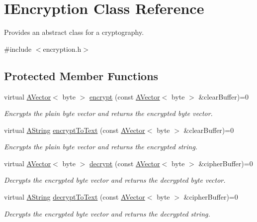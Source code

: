 \hypertarget{class_i_encryption}{}\section{I\+Encryption Class Reference}
\label{class_i_encryption}


Provides an abstract class for a cryptography.  




{\ttfamily \#include $<$encryption.\+h$>$}

\subsection*{Protected Member Functions}
\begin{DoxyCompactItemize}
\item 
virtual \mbox{\hyperlink{class_a_vector}{A\+Vector}}$<$ byte $>$ \mbox{\hyperlink{class_i_encryption_aa888b4e42172490054708fb099626458}{encrypt}} (const \mbox{\hyperlink{class_a_vector}{A\+Vector}}$<$ byte $>$ \&clear\+Buffer)=0
\begin{DoxyCompactList}\small\item\em Encrypts the plain byte vector and returns the encrypted byte vector. \end{DoxyCompactList}\item 
virtual \mbox{\hyperlink{class_a_string}{A\+String}} \mbox{\hyperlink{class_i_encryption_aef8211993831f83e031e7f1e9f978a4d}{encrypt\+To\+Text}} (const \mbox{\hyperlink{class_a_vector}{A\+Vector}}$<$ byte $>$ \&clear\+Buffer)=0
\begin{DoxyCompactList}\small\item\em Encrypts the plain byte vector and returns the encrypted string. \end{DoxyCompactList}\item 
virtual \mbox{\hyperlink{class_a_vector}{A\+Vector}}$<$ byte $>$ \mbox{\hyperlink{class_i_encryption_a07250dc1d1f1cd6de54df34e079f749d}{decrypt}} (const \mbox{\hyperlink{class_a_vector}{A\+Vector}}$<$ byte $>$ \&cipher\+Buffer)=0
\begin{DoxyCompactList}\small\item\em Decrypts the encrypted byte vector and returns the decrypted byte vector. \end{DoxyCompactList}\item 
virtual \mbox{\hyperlink{class_a_string}{A\+String}} \mbox{\hyperlink{class_i_encryption_ad1dafdacb077abfd40a995ae22ef0396}{decrypt\+To\+Text}} (const \mbox{\hyperlink{class_a_vector}{A\+Vector}}$<$ byte $>$ \&cipher\+Buffer)=0
\begin{DoxyCompactList}\small\item\em Decrypts the encrypted byte vector and returns the decrypted string. \end{DoxyCompactList}\end{DoxyCompactItemize}


